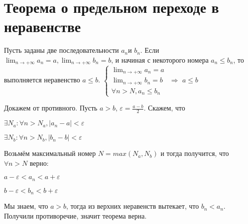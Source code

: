 \section[Т. о пред. перех. в нерав.]{Теорема о предельном переходе в неравенстве}
\begin{theorem}
Пусть заданы две последовательности ${a_n}$и ${b_n}$. Если $\displaystyle \lim_{n \to +\infty} a_n = a, \displaystyle \lim_{n \to +\infty} b_n = b$, и начиная с некоторого номера $a_n \leq b_n$, то выполняется неравенство $a \leq b$.  \newline
$\begin{cases}
\displaystyle \lim_{n \to +\infty} a_n = a \\ \displaystyle \lim_{n \to +\infty} b_n = b
\\ \forall n > N, a_n \leq b_n
\end{cases}$
$\Longrightarrow$ \qquad $\displaystyle a \leq b$
\end{theorem}
Докажем от противного. Пусть $a > b$, $\varepsilon = \frac{a - b}{2}$. Скажем, что
\begin{center}
$\exists N_a: \forall n > N_a, |a_n - a| < \varepsilon$
\end{center}
\begin{center}
$\exists N_b: \forall n > N_b, |b_n - b| < \varepsilon$
\end{center}
Возьмём максимальный номер $N = max(N_a, N_b)$ и тогда получится, что $\forall n > N$ верно:
\begin{center}
$a - \varepsilon < a_n < a + \varepsilon$
\end{center}
\begin{center}
$b - \varepsilon < b_n < b + \varepsilon$
\end{center}
 \begin{center}
 \end{center}

Мы знаем, что $a > b$, тогда из верхних неравенств вытекает, что $b_n < a_n$. Получили противоречие, значит теорема верна.




